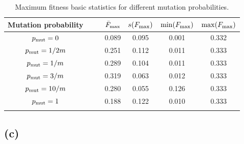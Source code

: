 \documentclass[12pt,titlepage]{article}
\begin{document}
\begin{table}[H]
\centering
\begin{tabular}{cc|cccc}
\toprule
\multicolumn{1}{c}{Mutation probability} & $\quad$ & $\bar{F}_{\textup{max}}$ & $s(F_{\textup{max}})$ & $\min(F_{\textup{max}})$ & $\max(F_{\textup{max}})$ \\
\midrule
$ p_{\textup{mut}} = 0 $ & & 0.089 & 0.095 & 0.001 & 0.332 \\
$ p_{\textup{mut}} = 1/2m $ & & 0.251 & 0.112 & 0.011 & 0.333 \\   
$ p_{\textup{mut}} = 1/m $ & & 0.289 & 0.104 & 0.011 & 0.333 \\      
$ p_{\textup{mut}} = 3/m $ & & 0.319 & 0.063 & 0.012 & 0.333 \\
$ p_{\textup{mut}} = 10/m $ & & 0.280 & 0.055 & 0.126 & 0.333 \\
$ p_{\textup{mut}} = 1 $ & & 0.188 & 0.122 & 0.010 & 0.333 \\
\bottomrule
\caption{Maximum fitness basic statistics for different mutation probabilities.}
\label{tab::mutation}
\end{tabular}
\end{table}

\subsection*{(c)}
\end{document}
